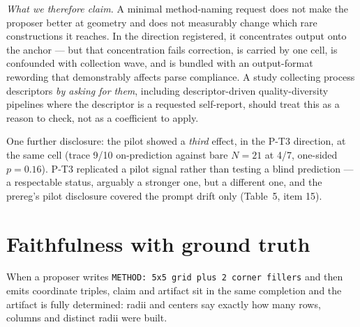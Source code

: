 \documentclass[11pt]{article}
\begin{document}
\textit{What we therefore claim.} A minimal method-naming request does not make the proposer better at
geometry and does not measurably change which rare constructions it reaches. In the direction
registered, it concentrates output onto the anchor --- but that concentration fails correction, is
carried by one cell, is confounded with collection wave, and is bundled with an output-format
rewording that demonstrably affects parse compliance. A study collecting process descriptors \textit{by
asking for them}, including descriptor-driven quality-diversity pipelines where the descriptor
is a requested self-report, should treat this as a reason to check, not as a coefficient to
apply.

One further disclosure: the pilot showed a \textit{third} effect, in the P-T3 direction, at the same
cell (trace 9/10 on-prediction against bare $N = 21$ at 4/7, one-sided $p = 0.16$). P-T3 replicated
a pilot signal rather than testing a blind prediction --- a respectable status, arguably a stronger
one, but a different one, and the prereg's pilot disclosure covered the prompt drift only
(Table~5, item 15).

\section{Faithfulness with ground truth}

When a proposer writes \texttt{METHOD: 5x5 grid plus 2 corner fillers} and then emits coordinate
triples, claim and artifact sit in the same completion and the artifact is fully determined:
radii and centers say exactly how many rows, columns and distinct radii were built.
\end{document}
